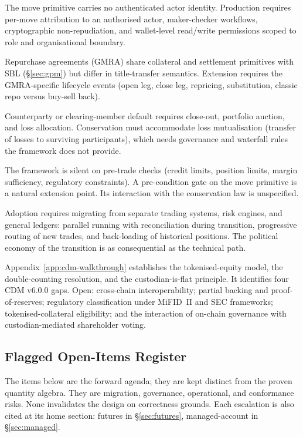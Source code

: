 \begin{description}[nosep]
\item[Access control and actor attribution.] The move primitive carries no authenticated actor identity. Production requires per-move attribution to an authorised actor, maker-checker workflows, cryptographic non-repudiation, and wallet-level read/write permissions scoped to role and organisational boundary.
\item[Repos.] Repurchase agreements (GMRA) share collateral and settlement primitives with SBL (\S\ref{sec:gpm}) but differ in title-transfer semantics. Extension requires the GMRA-specific lifecycle events (open leg, close leg, repricing, substitution, classic repo versus buy-sell back).
\item[Default management.] Counterparty or clearing-member default requires close-out, portfolio auction, and loss allocation. Conservation must accommodate loss mutualisation (transfer of losses to surviving participants), which needs governance and waterfall rules the framework does not provide.
\item[Pre-trade validation.] The framework is silent on pre-trade checks (credit limits, position limits, margin sufficiency, regulatory constraints). A pre-condition gate on the move primitive is a natural extension point. Its interaction with the conservation law is unspecified.
\item[Migration from legacy architectures.] Adoption requires migrating from separate trading systems, risk engines, and general ledgers: parallel running with reconciliation during transition, progressive routing of new trades, and back-loading of historical positions. The political economy of the transition is as consequential as the technical path.
\item[Tokenised securities.] Appendix~\ref{app:cdm-walkthrough} establishes the tokenised-equity model, the double-counting resolution, and the custodian-is-flat principle. It identifies four CDM v6.0.0 gaps. Open: cross-chain interoperability; partial backing and proof-of-reserves; regulatory classification under MiFID~II and SEC frameworks; tokenised-collateral eligibility; and the interaction of on-chain governance with custodian-mediated shareholder voting.
\end{description}

\subsection{Flagged Open-Items Register}

The items below are the forward agenda; they are kept distinct from the proven quantity algebra. They are migration, governance, operational, and conformance risks. None invalidates the design on correctness grounds. Each escalation is also cited at its home section: futures in \S\ref{sec:futures}, managed-account in \S\ref{sec:managed}.

